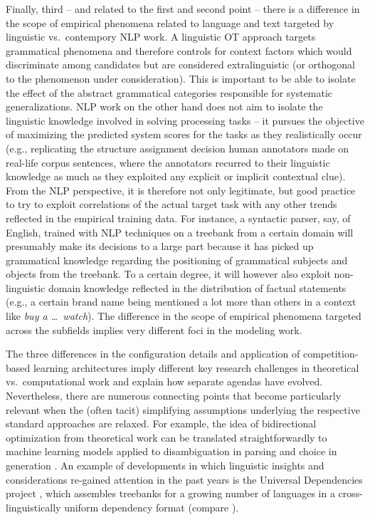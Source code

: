 \documentclass[output=paper,hidelinks]{langscibook}
\begin{document}
Finally, third -- and related to the first and second point -- there is a difference in the scope of empirical phenomena related to language and text targeted by linguistic vs.\ contempory NLP work.
A linguistic OT approach targets grammatical phenomena and therefore
controls for context factors which would discriminate among candidates but are considered extralinguistic (or orthogonal to the phenomenon under consideration). This is important to be able to isolate the effect of the abstract grammatical categories responsible for systematic generalizations.
NLP work on the other hand does not aim to isolate the linguistic knowledge involved in solving processing tasks -- it pursues the objective of maximizing the predicted system scores for the tasks as they realistically occur (e.g., replicating the structure assignment decision human annotators made on real-life corpus sentences, where the annotators recurred to their linguistic knowledge as much as they exploited any explicit or implicit contextual clue). From the NLP perspective, it is therefore not only legitimate, but good practice to try to exploit correlations of the actual target task with any other trends reflected in the empirical training data. For instance, a syntactic parser, say, of English, trained with NLP techniques on a treebank from a certain domain will presumably make its decisions to a large part because it has picked up grammatical knowledge regarding the positioning of grammatical subjects and objects from the treebank. To a certain degree, it will however also exploit non-linguistic domain knowledge reflected in the distribution of factual statements (e.g., a certain brand name being mentioned a lot more than others in a context like \emph{buy a \dots\ watch}). The difference in the scope of empirical phenomena targeted across the subfields implies very different foci in the modeling work. 


\begin{sloppypar} 
The three differences in the configuration details and application of competition-based learning architectures imply different key research challenges in theoretical vs.\ computational work and explain how separate agendas have evolved. Nevertheless, there are numerous connecting points that become particularly relevant when the (often tacit) simplifying assumptions underlying the respective standard approaches are relaxed. For example, the idea of bidirectional optimization from theoretical work can be translated straightforwardly to machine learning models applied to disambiguation in parsing and choice in generation \citep{cahill-riester-2009-incorporating,zarriess-etal-2011-underspecifying,yu-etal-2019-head}. %
An example of developments in which linguistic insights and considerations re-gained attention in the past years is the Universal Dependencies project \citep{UD}, which assembles treebanks for a growing number of languages in a cross-linguistically uniform dependency format (compare ).
\end{sloppypar}
\end{document}
